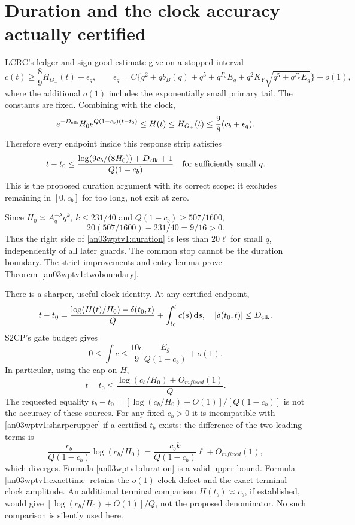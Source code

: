 \documentclass[11pt]{article}
\theoremstyle{remark}\newtheorem{remark}[theorem]{Remark}
\newcommand{\dd}{\,\mathrm d}
\newcommand{\Gp}{G_+}
\begin{document}
\section{Duration and the clock accuracy actually certified}
LCRC's ledger and sign-good estimate give on a stopped interval
\begin{equation}
 c(t)\ge\frac89H_{\Gp}(t)-\epsilon_q,\qquad
 \epsilon_q=C\{q^2+q b_B(q)+q^5+q^{\Gamma_\nu}E_g
       +q^2K_Y\sqrt{q^5+q^{\Gamma_\nu}E_g}\}+o(1),
 \label{an03wptv1:ledgerlower}
\end{equation}
where the additional $o(1)$ includes the exponentially small
primary tail. The constants are fixed. Combining with the clock,
\begin{equation}
 e^{-D_{\rm clk}}H_0e^{Q(1-c_b)(t-t_0)}
 \le H(t)\le H_{\Gp}(t)\le\frac98(c_b+\epsilon_q).
 \label{an03wptv1:durationineq}
\end{equation}
Therefore every endpoint inside this response strip satisfies
\begin{equation}
 t-t_0\le
 \frac{\log(9c_b/(8H_0))+D_{\rm clk}+1}{Q(1-c_b)}
 \quad\text{for sufficiently small }q.
 \label{an03wptv1:duration}
\end{equation}
This is the proposed duration argument with its correct scope:
it excludes remaining in $[0,c_b]$ for too long, not exit at zero.

Since $H_0\asymp A_q^{-\lambda}q^k$, $k\le231/40$ and
$Q(1-c_b)\ge507/1600$,
\[
 20(507/1600)-231/40=9/16>0.
\]
Thus the right side of \eqref{an03wptv1:duration} is less than
$20\ell$ for small $q$, independently of all later guards.
The common stop cannot be the duration boundary. The strict
improvements and entry lemma prove
Theorem~\ref{an03wptv1:twoboundary}.

There is a sharper, useful clock identity. At any certified endpoint,
\begin{equation}
 t-t_0=\frac{\log(H(t)/H_0)-\delta(t_0,t)}Q
                         +\int_{t_0}^t c(s)\dd s,
 \quad |\delta(t_0,t)|\le D_{\rm clk}.
 \label{an03wptv1:exacttime}
\end{equation}
S2CP's gate budget gives
\begin{equation}
 0\le\int c\le\frac{10e}{9}\frac{E_g}{Q(1-c_b)}+o(1).
 \label{an03wptv1:cint}
\end{equation}
In particular, using the cap on $H$,
\begin{equation}
 t-t_0\le\frac{\log(c_b/H_0)+O_{
m fixed}(1)}Q.
 \label{an03wptv1:sharperupper}
\end{equation}
The requested equality
$t_b-t_0=[\log(c_b/H_0)+O(1)]/[Q(1-c_b)]$ is not the
accuracy of these sources. For any fixed $c_b>0$ it is incompatible
with \eqref{an03wptv1:sharperupper} if a certified $t_b$ exists:
the difference of the two leading terms is
\[
 \frac{c_b}{Q(1-c_b)}\log(c_b/H_0)
 =\frac{c_b k}{Q(1-c_b)}\ell+O_{
m fixed}(1),
\]
which diverges. Formula \eqref{an03wptv1:duration} is a valid
upper bound. Formula \eqref{an03wptv1:exacttime} retains the
$o(1)$ clock defect and the exact terminal clock amplitude.
An additional terminal comparison $H(t_b)\asymp c_b$, if established,
would give $[\log(c_b/H_0)+O(1)]/Q$, not the proposed denominator.
No such comparison is silently used here.
\end{document}
